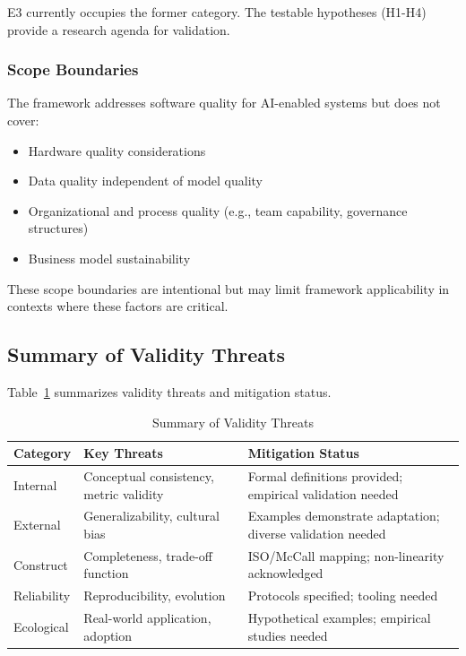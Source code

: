 E3 currently occupies the former category. The testable hypotheses (H1-H4) provide a research agenda for validation.

\subsubsection{Scope Boundaries}

The framework addresses software quality for AI-enabled systems but does not cover:

\begin{itemize}[leftmargin=2em]
    \item Hardware quality considerations
    \item Data quality independent of model quality
    \item Organizational and process quality (e.g., team capability, governance structures)
    \item Business model sustainability
\end{itemize}

These scope boundaries are intentional but may limit framework applicability in contexts where these factors are critical.

\subsection{Summary of Validity Threats}

Table~\ref{tab:validity_summary} summarizes validity threats and mitigation status.

\begin{table}[h]
\centering
\caption{Summary of Validity Threats}
\label{tab:validity_summary}
\small
\begin{tabularx}{\columnwidth}{@{}l X X@{}}
\toprule
\textbf{Category} & \textbf{Key Threats} & \textbf{Mitigation Status} \\
\midrule
Internal & Conceptual consistency, metric validity & Formal definitions provided; empirical validation needed \\
External & Generalizability, cultural bias & Examples demonstrate adaptation; diverse validation needed \\
Construct & Completeness, trade-off function & ISO/McCall mapping; non-linearity acknowledged \\
Reliability & Reproducibility, evolution & Protocols specified; tooling needed \\
Ecological & Real-world application, adoption & Hypothetical examples; empirical studies needed \\
\bottomrule
\end{tabularx}
\end{table}

